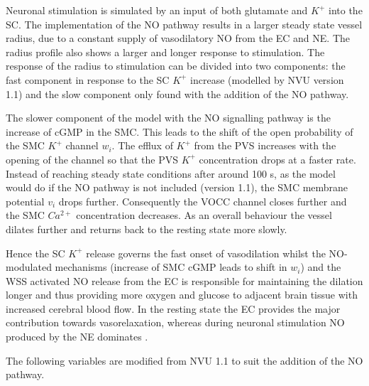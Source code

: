 		Neuronal stimulation is simulated by an input of both glutamate and $K^+$ into the SC. The implementation of the NO pathway results in a larger steady state vessel radius, due to a constant supply of vasodilatory NO from the EC and NE. The radius profile also shows a larger and longer response to stimulation. 
		The response of the radius to stimulation can be divided into two components: the fast component in response to the SC $K^+$ increase (modelled by NVU version 1.1) and the slow component only found with the addition of the NO pathway. 
		
		The slower component of the model with the NO signalling pathway is the increase of cGMP in the SMC. This leads to the shift of the open probability of the SMC $K^+$ channel $w_i$. The  efflux of $K^+$ from the PVS increases with the opening of the channel so that the PVS $K^+$ concentration drops at a faster rate. Instead of reaching steady state conditions after around 100 s, as the model would do if the NO pathway is not included (version 1.1), the SMC membrane potential $v_i$ drops further. Consequently the VOCC channel closes further and the SMC $Ca^{2+}$ concentration decreases. As an overall behaviour the vessel dilates further and returns back to the resting state more slowly. 
		
		Hence the SC $K^+$ release governs the fast onset of vasodilation whilst the NO-modulated mechanisms (increase of SMC cGMP leads to shift in $w_i$) and the WSS activated NO release from the EC is responsible for maintaining the dilation longer and thus providing more oxygen and glucose to adjacent brain tissue with increased cerebral blood flow. In the resting state the EC provides the major contribution towards vasorelaxation, whereas during neuronal stimulation NO produced by the NE dominates \citep{Dormanns2016}.	
		
		The following variables are modified from NVU 1.1 to suit the addition of the NO pathway.
		
		
